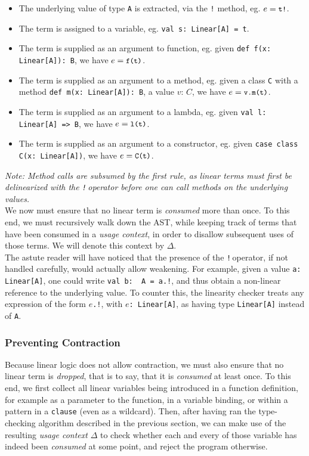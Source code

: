 \documentclass[a4paper,twoside]{article}
\newcommand{\stt}[1]{\texttt{\small{#1}}}
\begin{document}
\begin{itemize}
\item The underlying value of type \stt{A} is extracted, via the \stt{!} method, eg. $e = \stt{t!}$.
\item The term is assigned to a variable, eg. \stt{val s:\,Linear[A] = t}.
\item The term is supplied as an argument to function, eg. given \stt{def f(x:\,Linear[A]):\,B}, we have $e = \stt{f(t)}$.
\item The term is supplied as an argument to a method, eg. given a class \stt{C} with a method \stt{def m(x:\,Linear[A]):\,B}, a value $v:\, C$, we have $e = \stt{v.m(t)}$.
\item The term is supplied as an argument to a lambda, eg. given \stt{val l:\,Linear[A] => B}, we have $e = \stt{l(t)}$.
\item The term is supplied as an argument to a constructor, eg. given \stt{case class C(x: Linear[A])}, we have $e = \stt{C(t)}$.
\end{itemize}

\textit{Note: Method calls are subsumed by the first rule, as linear terms must first be delinearized with the \stt{!}\,operator before one can call methods on the underlying values.}\\

We now must ensure that no linear term is \textit{consumed} more than once. To this end, we must recursively walk down the AST, while keeping track of terms that have been consumed in a \textit{usage context}, in order to disallow subsequent uses of those terms. We will denote this context by $\Delta$.\\

The astute reader will have noticed that the presence of the \stt{!}\,operator, if not handled carefully, would actually allow weakening. For example, given a value \stt{a:\,Linear[A]}, one could write \stt{val b:\, A = a.!}, and thus obtain a non-linear reference to the underlying value. To counter this, the linearity checker treats any expression of the form \stt{$e$.!}, with \stt{$e$:\,Linear[A]}, as having type \stt{Linear[A]} instead of \stt{A}.

\subsubsection{Preventing Contraction}

Because linear logic does not allow contraction, we must also ensure that no linear term is \textit{dropped}, that is to say, that it is \textit{consumed} at least once. To this end, we first collect all linear variables being introduced in a function definition, for example as a parameter to the function, in a variable binding, or within a pattern in a \texttt{clause} (even as a wildcard). Then, after having ran the type-checking algorithm described in the previous section, we can make use of the resulting \textit{usage context} $\Delta$ to check whether each and every of those variable has indeed been \textit{consumed} at some point, and reject the program otherwise.
\end{document}
